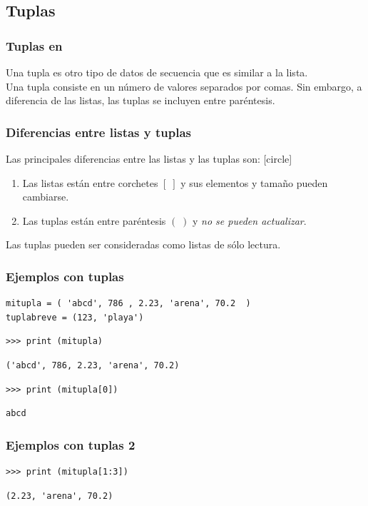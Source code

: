 {\subsection{Tuplas}
\begin{frame}
\frametitle{Tuplas en \python}
Una tupla es otro tipo de datos de secuencia que es similar a la lista.
\\
\bigskip
Una tupla consiste en un número de valores separados por comas. Sin embargo, a diferencia de las listas, las tuplas se incluyen entre paréntesis.
\end{frame}
\begin{frame}
\frametitle{Diferencias entre listas y tuplas}
Las principales diferencias entre las listas y las tuplas son:
[circle]
\begin{enumerate}[<+->]
\item Las listas están entre corchetes $[\;]$ y sus elementos y tamaño pueden cambiarse.
\item Las tuplas están entre paréntesis $(\;)$ y \emph{no se pueden actualizar}.
\end{enumerate}
\pause
Las tuplas pueden ser consideradas como listas de sólo lectura.
\end{frame}
\begin{frame}[fragile]
\frametitle{Ejemplos con tuplas}
\begin{verbatim}
mitupla = ( 'abcd', 786 , 2.23, 'arena', 70.2  )
tuplabreve = (123, 'playa')
\end{verbatim}
\pause
\begin{verbatim}
>>> print (mitupla)
\end{verbatim}
\pause
\begin{verbatim}
('abcd', 786, 2.23, 'arena', 70.2)
\end{verbatim}
\pause
\begin{verbatim}
>>> print (mitupla[0])
\end{verbatim}
\pause
\begin{verbatim}
abcd
\end{verbatim}
\end{frame}
\begin{frame}[fragile]
\frametitle{Ejemplos con tuplas 2}
\begin{verbatim}
>>> print (mitupla[1:3])
\end{verbatim}
\pause
\begin{verbatim}
(2.23, 'arena', 70.2)
\end{verbatim}

\end{frame}}
